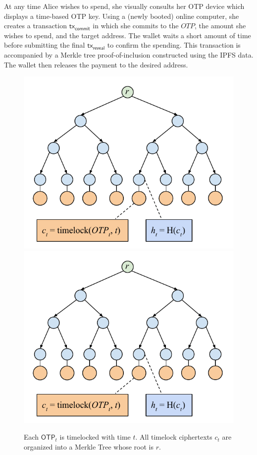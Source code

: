 At any time Alice wishes to spend, she visually consults her OTP device which displays a time-based
OTP key. Using a (newly booted) online computer, she creates a transaction $\textsf{tx}_\textsf{commit}$ in
which she commits to the $OTP$, the amount she wishes to spend, and the target address.
The wallet waits a short amount of time before submitting the final $\textsf{tx}_\textsf{reveal}$
to confirm the spending. This transaction is accompanied by a Merkle tree proof-of-inclusion
constructed using the IPFS data. The wallet then releases the payment to the desired address.

\begin{figure}[H]
    \caption{Each $\textsf{OTP}_t$ is timelocked with time $t$. All timelock
             ciphertexts $c_t$ are
             organized into a Merkle Tree whose root is $r$.}
    \centering
    \iftwocolumn
        \includegraphics[width=\columnwidth,keepaspectratio]{figures/timelock-merkle.pdf}
    \else
        \includegraphics[width=0.6 \columnwidth,keepaspectratio]{figures/timelock-merkle.pdf}
    \fi
    \label{fig.merkle-otp}
\end{figure}

